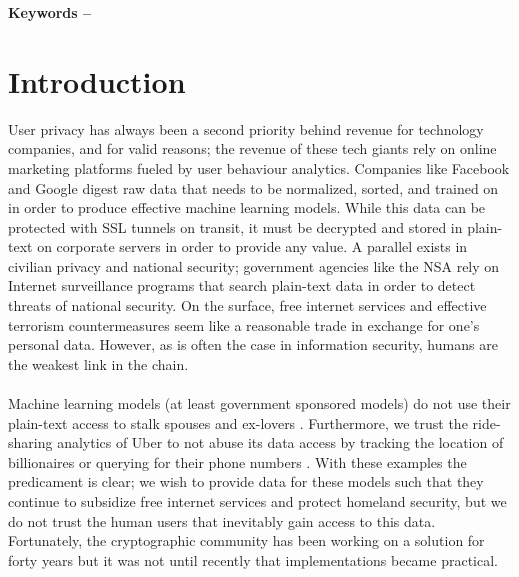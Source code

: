 \documentclass[10pt, a4paper]{article}
\title{\mytitle}
\author{\myauthor\hspace{1em}\\\contact\\Edinburgh Napier University\hspace{0.5em}-\hspace{0.5em}\mymodule}
\date{}
\begin{document}
	\maketitle
	\begin{abstract}
		This coursework is focused on homomorphic encryption, a system that allows one to perform arbitrary functions on a cipher-text without the need to decrypt the cipher-text in advance. The rapid development of homomorphic encryption is reviewed by investigating notable papers, mainly from the past decade.  Using open source implementations of these papers, a homomorphic exchange is simulated in order  to demonstrate the potential homomorphic cryptography has in privacy-preserving surveillance. Security parameters from this exchange are benchmarked in order to optimize noise budget and computational time.
	\end{abstract}
    
	\textbf{Keywords -- }{\mykeywords}

	\section{Introduction}
	
	User privacy has always been a second priority behind revenue for technology companies, and for valid reasons; the revenue of these tech giants rely on  online marketing platforms fueled by user behaviour analytics. Companies like Facebook and Google digest raw data that needs to be normalized, sorted, and trained on in order to produce effective machine learning models. While this data can be protected with SSL tunnels on transit, it must be decrypted and stored in plain-text on corporate servers in order to provide any value. A parallel exists in civilian privacy and national security; government agencies like the NSA rely on Internet surveillance programs that search plain-text data in order to detect threats of national security. On the surface, free internet services and effective terrorism countermeasures seem like a reasonable trade in exchange for one's personal data. However, as is often the case in information security, humans are the weakest link in the chain. 
	\paragraph{}Machine learning models (at least government sponsored models) do not use their plain-text access to stalk spouses and ex-lovers \cite{Selyukh:2013}. Furthermore, we trust the ride-sharing analytics of Uber to not abuse its data access by tracking the location of billionaires or querying for their phone numbers \cite{pymnts}. With these examples the predicament is clear; we wish to provide data for these models such that they continue to subsidize free internet services and protect homeland security, but we do not trust the human users that inevitably gain access to this data. Fortunately, the cryptographic community has been working on a solution for forty years  but it was not until recently that implementations became practical. 
\end{document}
